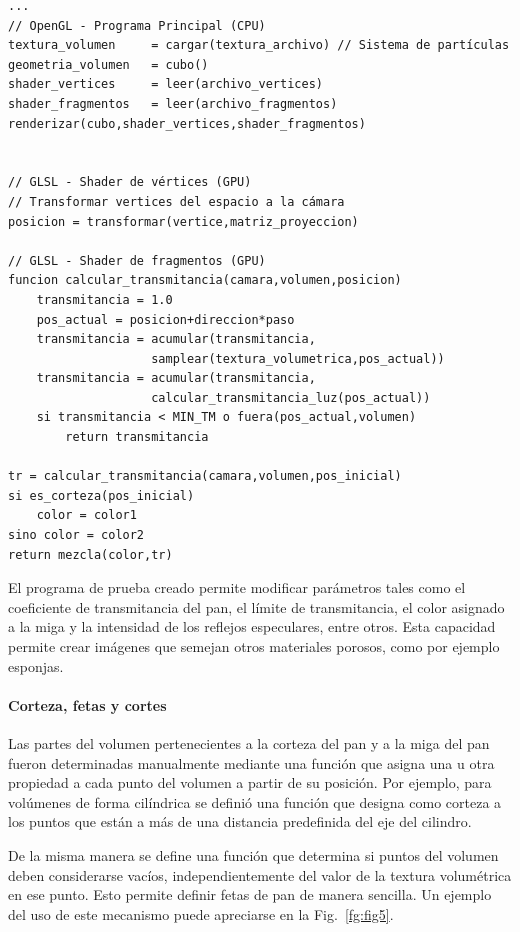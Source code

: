 \documentclass[oneside,a4paper,spanish,links]{amca}
\begin{document}
\begin{verbatim}
...
// OpenGL - Programa Principal (CPU)
textura_volumen     = cargar(textura_archivo) // Sistema de partículas
geometria_volumen   = cubo()
shader_vertices     = leer(archivo_vertices)
shader_fragmentos   = leer(archivo_fragmentos)
renderizar(cubo,shader_vertices,shader_fragmentos)


// GLSL - Shader de vértices (GPU)
// Transformar vertices del espacio a la cámara
posicion = transformar(vertice,matriz_proyeccion)

// GLSL - Shader de fragmentos (GPU)
funcion calcular_transmitancia(camara,volumen,posicion)
    transmitancia = 1.0
    pos_actual = posicion+direccion*paso
    transmitancia = acumular(transmitancia,
                    samplear(textura_volumetrica,pos_actual))
    transmitancia = acumular(transmitancia,
                    calcular_transmitancia_luz(pos_actual))
    si transmitancia < MIN_TM o fuera(pos_actual,volumen)
        return transmitancia

tr = calcular_transmitancia(camara,volumen,pos_inicial)
si es_corteza(pos_inicial)
    color = color1
sino color = color2
return mezcla(color,tr)
\end{verbatim}

El programa de prueba creado permite modificar parámetros tales como
el coeficiente de transmitancia del pan, el límite de transmitancia,
el color asignado a la miga y la intensidad de los reflejos especulares,
entre otros. Esta capacidad permite crear imágenes que semejan otros
materiales porosos, como por ejemplo esponjas.

\paragraph{Corteza, fetas y cortes}

Las partes del volumen pertenecientes a la corteza del pan y a la miga
del pan fueron determinadas manualmente mediante una función que
asigna una u otra propiedad a cada punto del volumen a partir de su
posición. Por ejemplo, para volúmenes de forma cilíndrica se definió
una función que designa como corteza a los puntos que están a más de
una distancia predefinida del eje del cilindro.

De la misma manera se define una función que determina si puntos del
volumen deben considerarse vacíos, independientemente del valor de la
textura volumétrica en ese punto. Esto permite definir fetas de pan de
manera sencilla. Un ejemplo del uso de este mecanismo puede apreciarse
en la Fig.~\ref{fg:fig5}.
\end{document}
